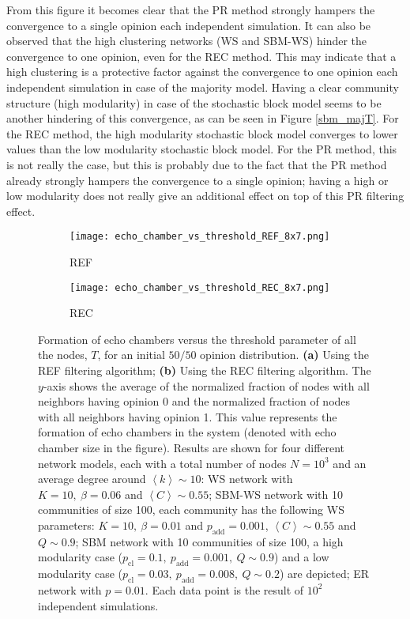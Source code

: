 \documentclass[11 pt , letterpaper , twoside , openright]{book}
\begin{document}
From this figure it becomes clear that the PR method strongly hampers the convergence to a single opinion each independent simulation. It can also be observed that the high clustering networks (WS and SBM-WS) hinder the convergence to one opinion, even for the REC method. This may indicate that a high clustering is a protective factor against the convergence to one opinion each independent simulation in case of the majority model. Having a clear community structure (high modularity) in case of the stochastic block model seems to be another hindering of this convergence, as can be seen in Figure \ref{sbm_majT}.  For the REC method, the high modularity stochastic block model converges to lower values than the low modularity stochastic block model. For the PR method, this is not really the case, but this is probably due to the fact that the PR method already strongly hampers the convergence to a single opinion; having a high or low modularity does not really give an additional effect on top of this PR filtering effect.

\begin{figure}[H]
  \begin{subfigure}[b]{0.49\textwidth}
  	\texttt{[image: echo\_chamber\_vs\_threshold\_REF\_8x7.png]}
    \caption{REF}
    \label{REF_thres}
  \end{subfigure}
  \begin{subfigure}[b]{0.49\textwidth}
  	\texttt{[image: echo\_chamber\_vs\_threshold\_REC\_8x7.png]}
    \caption{REC}
    \label{REC_thres}
  \end{subfigure}
  \captionsetup{format=plain}
  \caption[Formation of echo chambers versus the threshold parameter of all the nodes, $T$, for the REF and REC filtering algorithms and an initial $50/50$ opinion distribution.]{Formation of echo chambers versus the threshold parameter of all the nodes, $T$, for an initial $50/50$ opinion distribution. \textbf{(a)} Using the REF filtering algorithm; \textbf{(b)} Using the REC filtering algorithm. The $y$-axis shows the average of the normalized fraction of nodes with all neighbors having opinion 0 and the normalized fraction of nodes with all neighbors having opinion 1. This value represents the formation of echo chambers in the system (denoted with echo chamber size in the figure). Results are shown for four different network models, each with a total number of nodes $N=10^3$ and an average degree around $\left<k\right> \sim 10$: WS network with $K =10,\ \beta = 0.06$ and $\left<C\right> \sim 0.55$; SBM-WS network with 10 communities of size 100, each community has the following WS parameters: $K = 10,\ \beta = 0.01$ and $p_{\text{add}} = 0.001$, $\left<C\right> \sim 0.55$ and $Q \sim 0.9$; SBM network with 10 communities of size 100, a high modularity case ($p_{\text{cl}} = 0.1,\ p_{\text{add}} = 0.001,\ Q \sim 0.9$) and a low modularity case ($p_{\text{cl}} = 0.03,\ p_{\text{add}} = 0.008,\ Q \sim 0.2$) are depicted; ER network with $p= 0.01$. Each data point is the result of $10^2$ independent simulations.}
\label{echo_vs_threshold_REF-REC}
\end{figure}
\end{document}
